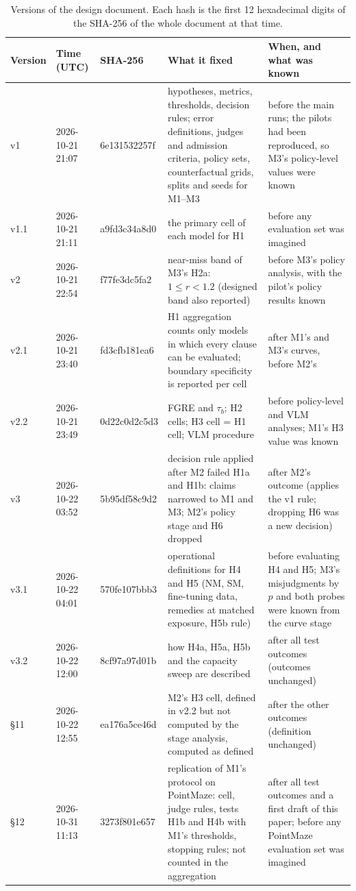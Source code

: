 \documentclass[10pt]{article}
\begin{document}
\begin{table}[h]
\caption{Versions of the design document. Each hash is the first 12 hexadecimal digits of the SHA-256 of the whole document at that time.}
\label{tab:prereg}
\centering\small
\setlength{\tabcolsep}{4pt}
\begin{tabular}{>{\raggedright}p{1.15cm}>{\raggedright}p{2.15cm}>{\raggedright}p{2.3cm}>{\raggedright}p{4.85cm}>{\raggedright\arraybackslash}p{3.65cm}}
\toprule
Version & Time (UTC) & SHA-256 & What it fixed & When, and what was known \\
\midrule
v1 & 2026-10-21 21:07 & 6e131532257f & hypotheses, metrics, thresholds, decision rules; error definitions, judges and admission criteria, policy sets, counterfactual grids, splits and seeds for M1--M3 & before the main runs; the pilots had been reproduced, so M3's policy-level values were known \\
v1.1 & 2026-10-21 21:11 & a9fd3c34a8d0 & the primary cell of each model for H1 & before any evaluation set was imagined \\
v2 & 2026-10-21 22:54 & f77fe3dc5fa2 & near-miss band of M3's H2a: $1\le r<1.2$ (designed band also reported) & before M3's policy analysis, with the pilot's policy results known \\
v2.1 & 2026-10-21 23:40 & fd3cfb181ea6 & H1 aggregation counts only models in which every clause can be evaluated; boundary specificity is reported per cell & after M1's and M3's curves, before M2's \\
v2.2 & 2026-10-21 23:49 & 0d22c0d2c5d3 & FGRE and $\tau_b$; H2 cells; H3 cell = H1 cell; VLM procedure & before policy-level and VLM analyses; M1's H3 value was known \\
v3 & 2026-10-22 03:52 & 5b95df58c9d2 & decision rule applied after M2 failed H1a and H1b: claims narrowed to M1 and M3; M2's policy stage and H6 dropped & after M2's outcome (applies the v1 rule; dropping H6 was a new decision) \\
v3.1 & 2026-10-22 04:01 & 570fe107bbb3 & operational definitions for H4 and H5 (NM, SM, fine-tuning data, remedies at matched exposure, H5b rule) & before evaluating H4 and H5; M3's misjudgments by $p$ and both probes were known from the curve stage \\
v3.2 & 2026-10-22 12:00 & 8cf97a97d01b & how H4a, H5a, H5b and the capacity sweep are described & after all test outcomes (outcomes unchanged) \\
\S11 & 2026-10-22 12:55 & ea176a5ce46d & M2's H3 cell, defined in v2.2 but not computed by the stage analysis, computed as defined & after the other outcomes (definition unchanged) \\
\S12 & 2026-10-31 11:13 & 3273f801e657 & replication of M1's protocol on PointMaze: cell, judge rules, tests H1b and H4b with M1's thresholds, stopping rules; not counted in the aggregation & after all test outcomes and a first draft of this paper; before any PointMaze evaluation set was imagined \\
\bottomrule
\end{tabular}
\end{table}
\end{document}
